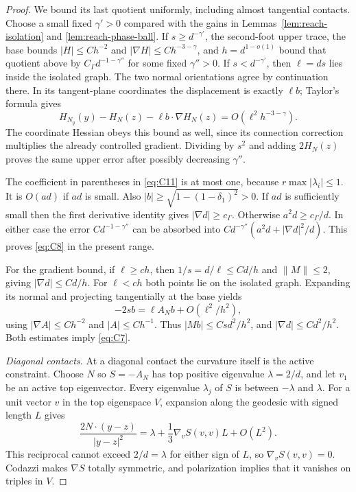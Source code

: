 \begin{proof}
We bound its last quotient uniformly, including almost tangential
contacts.  Choose a small fixed $\gamma'>0$ compared with the gains
in Lemmas~\ref{lem:reach-isolation} and \ref{lem:reach-phase-ball}.
If $s\ge d^{-\gamma'}$, the second-foot upper trace, the base bounds
$|H|\le Ch^{-2}$ and $|\nabla H|\le Ch^{-3-\gamma}$, and
$h=d^{1-o(1)}$ bound that quotient above by
$C_\Gamma d^{-1-\gamma''}$ for some fixed $\gamma''>0$.
If $s<d^{-\gamma'}$, then $\ell=ds$ lies inside the isolated graph.
The two normal orientations agree by continuation there.  In its
tangent-plane coordinates the displacement is exactly $\ell b$;
Taylor's formula gives
\[
 H_{N_y}(y)-H_N(z)-\ell b\cdot\nabla H_N(z)
 =O(\ell^2h^{-3-\gamma}).
\]
The coordinate Hessian obeys this bound as well, since its connection
correction multiplies the already controlled gradient.  Dividing by
$s^2$ and adding $2H_N(z)$ proves the same upper error after possibly
decreasing $\gamma''$.

The coefficient in parentheses in \eqref{eq:C11} is at most one,
because $r\max|\lambda_i|\le1$.  It is $O(ad)$ if $ad$ is small.
Also $|b|\ge\sqrt{1-(1-\delta_1)^2}>0$.  If $ad$ is sufficiently
small then the first derivative identity gives
$|\nabla d|\ge c_\Gamma$.  Otherwise $a^2d\ge c_\Gamma/d$.
In either case the error $C d^{-1-\gamma''}$ can be absorbed into
$C d^{-\gamma''}(a^2d+|\nabla d|^2/d)$.  This proves
\eqref{eq:C8} in the present range.

For the gradient bound, if $\ell\ge ch$, then
$1/s=d/\ell\le Cd/h$ and $\|M\|\le2$, giving
$|\nabla d|\le Cd/h$.  For $\ell<ch$ both points lie on the
isolated graph.  Expanding its normal and projecting tangentially
at the base yields
\[
 -2s b=\ell A_Nb+O(\ell^2/h^2),
\]
using $|\nabla A|\le Ch^{-2}$ and $|A|\le Ch^{-1}$.
Thus $|Mb|\le Cs d^2/h^2$, and
$|\nabla d|\le C d^2/h^2$.  Both estimates imply \eqref{eq:C7}.

\emph{Diagonal contacts.}
At a diagonal contact the curvature itself is the active constraint.
Choose $N$ so $S=-A_N$ has
top positive eigenvalue $\lambda=2/d$, and let $v_1$ be an active
top eigenvector.  Every eigenvalue $\lambda_j$ of $S$ is between
$-\lambda$ and $\lambda$.  For a unit vector $v$ in the top
eigenspace $V$, expansion along the geodesic with signed length $L$
gives
\[
 \frac{2N\cdot(y-z)}{|y-z|^2}
 =\lambda+\frac13\nabla_vS(v,v)L+O(L^2).
\]
This reciprocal cannot exceed $2/d=\lambda$ for either sign of
$L$, so $\nabla_vS(v,v)=0$.  Codazzi makes $\nabla S$ totally
symmetric, and polarization implies that it vanishes on triples
in $V$.


\end{proof}
